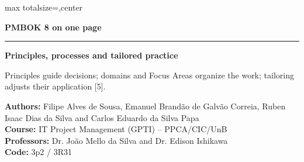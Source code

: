 \documentclass[12pt]{article}
\newcommand{\corpo}{\fontsize{16}{21}\selectfont}
\newcommand{\blocoautores}{%
  \textbf{Authors:} Filipe Alves de Sousa, Emanuel Brandão de Galvão Correia, Ruben Isaac Dias da Silva and Carlos Eduardo da Silva Papa\\
  \textbf{Course:} IT Project Management (GPTI) -- PPCA/CIC/UnB\\
  \textbf{Professors:} Dr. João Mello da Silva and Dr. Edison Ishikawa\\
  \textbf{Code:} 3p2 / 3R31}
\begin{document}
\thispagestyle{empty}
\corpo

\noindent\begin{adjustbox}{max totalsize={\textwidth}{\textheight},center}
\parbox{\textwidth}{%
\raggedright

\begin{tcolorbox}[enhanced,colback=exLine,colframe=exLine,coltext=white,arc=2mm,
  left=6mm,right=6mm,top=4mm,bottom=4mm]
{\centering\fontsize{32}{37}\selectfont\bfseries PMBOK 8 on one page\par}
\vspace{2.5mm}
\noindent\textcolor{white}{\rule{\linewidth}{0.5pt}}\par
\vspace{2.5mm}
\noindent\begin{minipage}[t]{0.48\linewidth}\raggedright
{\fontsize{18}{22}\selectfont\bfseries Principles, processes and tailored practice\par}
\vspace{1.5mm}
{\fontsize{14}{18}\selectfont Principles guide decisions; domains and Focus Areas organize the work; tailoring adjusts their application [5].\par}
\end{minipage}\hfill
\begin{minipage}[t]{0.48\linewidth}\raggedright
{\fontsize{13}{17}\selectfont\blocoautores\par}
\end{minipage}
\end{tcolorbox}

\vspace{4mm}

}
\end{adjustbox}
\end{document}
